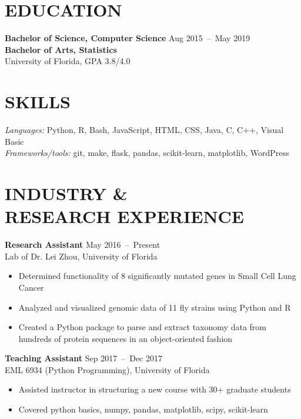 \documentclass[line,resmargin]{res}
\begin{document}
\address{}
\address{}

\begin{resume}

\section{EDUCATION}
    \textbf{Bachelor of Science, Computer Science} \hfill Aug 2015~--~May 2019 \\
    \textbf{Bachelor of Arts, Statistics} \\
    University of Florida, GPA 3.8/4.0


\section{SKILLS}
    {\sl Languages:} Python, R, Bash, JavaScript, HTML, CSS, Java, C, C++, Visual Basic \\
    {\sl Frameworks/tools:} git, make, flask, pandas, scikit-learn, matplotlib, WordPress

\section{INDUSTRY \& \\ RESEARCH EXPERIENCE}
    \textbf{Research Assistant}    \hfill May 2016~--~Present \\
    Lab of Dr. Lei Zhou, University of Florida
    \begin{itemize}  \itemsep -2pt %
        \item Determined functionality of 8 significantly mutated genes in Small Cell Lung Cancer
        \item Analyzed and visualized genomic data of 11 fly strains using Python and R
        \item Created a Python package to parse and extract taxonomy data from hundreds of protein sequences in an object-oriented fashion
    \end{itemize}

    \textbf{Teaching Assistant}    \hfill Sep 2017~--~Dec 2017 \\
    EML 6934 (Python Programming), University of Florida
    \begin{itemize}  \itemsep -2pt %
        \item Assisted instructor in structuring a new course with 30+ graduate students
        \item Covered python basics, numpy, pandas, matplotlib, scipy, scikit-learn
    \end{itemize}


\end{resume}
\end{document}
